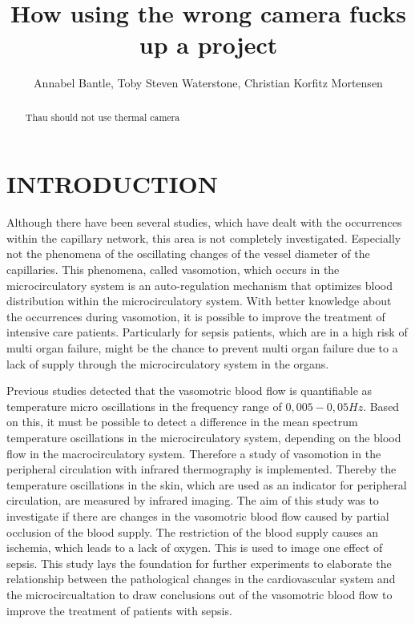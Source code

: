 \documentclass[a4paper, 10pt, conference]{ieeeconf}      %
\title{\LARGE \bf
	How using the wrong camera fucks up a project 
}
\author{Annabel Bantle, Toby Steven Waterstone, Christian Korfitz Mortensen}%
\begin{document}
	
	
	
	\maketitle
	\thispagestyle{empty}
	\pagestyle{empty}
	
	
	\begin{abstract}
		
	Thau should not use thermal camera
		
	\end{abstract}
	
	
	\section{INTRODUCTION}
	
	Although there have been several studies, which have dealt with the occurrences within the capillary network, this area is not completely investigated. Especially not the phenomena of the oscillating changes of the vessel diameter of the capillaries. This phenomena, called vasomotion, which occurs in the microcirculatory system is an auto-regulation mechanism that optimizes blood distribution within the microcirculatory system.
	With better knowledge about the occurrences during vasomotion, it is possible to improve the treatment of intensive care patients. Particularly for sepsis patients, which are in a high risk of multi organ failure, might be the chance to prevent multi organ failure due to a lack of supply through the microcirculatory system in the organs.
	
	Previous studies detected that the vasomotric blood flow is quantifiable as temperature micro oscillations in the frequency range of $0,005 - 0,05 Hz$. Based on this, it must be possible to detect a difference in the mean spectrum temperature oscillations in the microcirculatory system, depending on the blood flow in the macrocirculatory system.
	Therefore a study of vasomotion in the peripheral circulation with infrared thermography is implemented. Thereby the temperature oscillations in the skin, which are used as an indicator for peripheral circulation, are measured by infrared imaging. The aim of this study was to investigate if there are changes in the vasomotric blood flow caused by partial occlusion of the blood supply. The restriction of the blood supply causes an ischemia, which leads to a lack of oxygen. This is used to image one effect of sepsis.
	This study lays the foundation for further experiments to elaborate the relationship between the pathological changes in the cardiovascular system and the microcircualtation to draw conclusions out of the vasomotric blood flow to improve the treatment of patients with sepsis.
	
\end{document}
